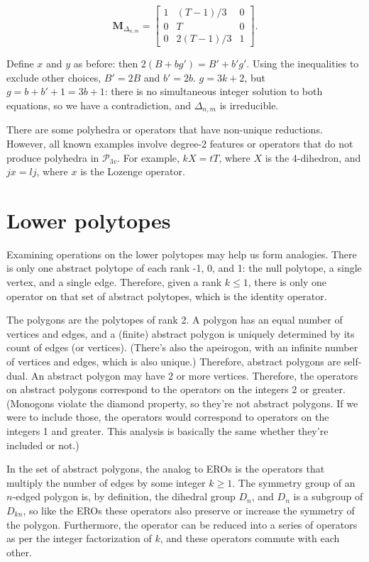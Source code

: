 \documentclass{amsart}[12pt]
\begin{document}
\begin{equation}
   \mathbf{M}_{\Delta_{n,m}} = \begin{bmatrix}
          1 & (T-1)/3 & 0 \\
          0 & T & 0 \\
          0 & 2(T-1)/3 & 1 \end{bmatrix}.
\end{equation}

Define $x$ and $y$ as before: then $2(B+bg') = B'+b'g'$. Using the
inequalities to exclude other choices, $B' = 2B$ and $b' = 2b$.
$g = 3k + 2$, but $g = b+ b' + 1 = 3b+1$:
there is no simultaneous integer solution to both equations,
so we have a contradiction, and $\Delta_{n,m}$ is irreducible.

There are some polyhedra or operators that have non-unique reductions. However,
all known examples involve degree-2 features or operators that do not produce
polyhedra in $\mathcal{P}_{3v}$. For example, $kX = tT$, where $X$ is the
4-dihedron, and $jx = lj$, where $x$ is the Lozenge operator.

\section{Lower polytopes}

Examining operations on the lower polytopes may help us form analogies.
There is only one abstract polytope of each rank -1, 0, and 1:
the null polytope, a single vertex, and a single edge. Therefore,
given a rank $k \le 1$, there is only one operator on that set of abstract
polytopes, which is the identity operator.

The polygons are the polytopes of rank 2. A polygon has an equal number of
vertices and edges, and a (finite) abstract polygon is uniquely determined by
its count of edges (or vertices). (There's also the apeirogon, with an infinite
number of vertices and edges, which is also unique.) Therefore, abstract
polygons are self-dual. An abstract polygon may have 2 or more vertices.
Therefore, the operators on abstract polygons correspond to the operators on
the integers 2 or greater. (Monogons violate the diamond property, so they're
not abstract polygons. If we were to include those, the operators would
correspond to operators on the integers 1 and greater.
This analysis is basically the same whether they're included or not.)

In the set of abstract polygons, the analog to EROs is the operators that
multiply the number of edges by some integer $k \ge 1$. The symmetry group of
an $n$-edged polygon is, by definition, the dihedral group $D_n$, and $D_n$ is
a subgroup of $D_{kn}$, so like the EROs these operators also preserve or
increase the symmetry of the polygon. Furthermore, the operator can be reduced
into a series of operators as per the integer factorization of $k$, and these
operators commute with each other.
\end{document}
